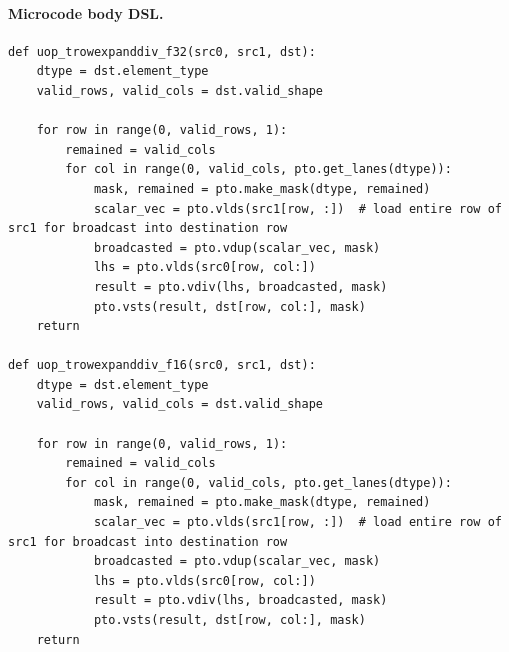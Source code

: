 \paragraph{Microcode body DSL.}
\begin{lstlisting}[style=ptocode]
def uop_trowexpanddiv_f32(src0, src1, dst):
    dtype = dst.element_type
    valid_rows, valid_cols = dst.valid_shape

    for row in range(0, valid_rows, 1):
        remained = valid_cols
        for col in range(0, valid_cols, pto.get_lanes(dtype)):
            mask, remained = pto.make_mask(dtype, remained)
            scalar_vec = pto.vlds(src1[row, :])  # load entire row of src1 for broadcast into destination row
            broadcasted = pto.vdup(scalar_vec, mask)
            lhs = pto.vlds(src0[row, col:])
            result = pto.vdiv(lhs, broadcasted, mask)
            pto.vsts(result, dst[row, col:], mask)
    return

def uop_trowexpanddiv_f16(src0, src1, dst):
    dtype = dst.element_type
    valid_rows, valid_cols = dst.valid_shape

    for row in range(0, valid_rows, 1):
        remained = valid_cols
        for col in range(0, valid_cols, pto.get_lanes(dtype)):
            mask, remained = pto.make_mask(dtype, remained)
            scalar_vec = pto.vlds(src1[row, :])  # load entire row of src1 for broadcast into destination row
            broadcasted = pto.vdup(scalar_vec, mask)
            lhs = pto.vlds(src0[row, col:])
            result = pto.vdiv(lhs, broadcasted, mask)
            pto.vsts(result, dst[row, col:], mask)
    return
\end{lstlisting}
\Needspace{0.34\textheight}
